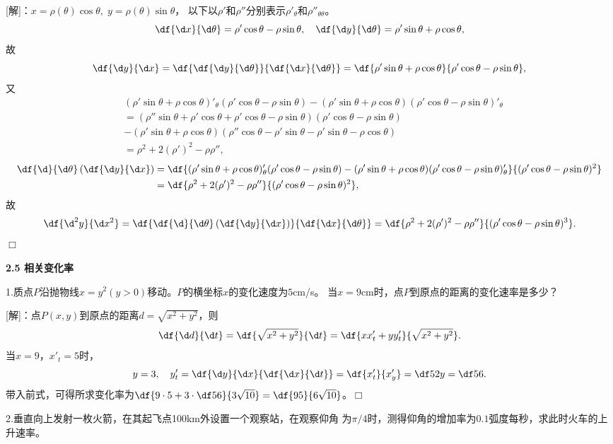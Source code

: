 [解]：$x=\rho(\theta)\cos\theta,\;y=\rho(\theta)\sin\theta$，
以下以$\rho'$和$\rho''$分别表示$\rho'_{\theta}$和$\rho''_{\theta\theta}$。
$$\df{\d x}{\d\theta}=\rho'\cos\theta-\rho\sin\theta,
\quad
\df{\d y}{\d\theta}=\rho'\sin\theta+\rho\cos\theta,$$
故
$$\df{\d y}{\d x}=\df{\df{\d y}{\d\theta}}{\df{\d x}{\d\theta}}
=\df{\rho'\sin\theta+\rho\cos\theta}{\rho'\cos\theta-\rho\sin\theta},$$
又
\begin{align*}
	&(\rho'\sin\theta+\rho\cos\theta)'_{\theta}(\rho'\cos\theta-\rho\sin\theta)
	-(\rho'\sin\theta+\rho\cos\theta)(\rho'\cos\theta-\rho\sin\theta)'_{\theta}\\
	&=(\rho''\sin\theta+\rho'\cos\theta+\rho'\cos\theta-\rho\sin\theta)
	(\rho'\cos\theta-\rho\sin\theta)\\
	&-(\rho'\sin\theta+\rho\cos\theta)
	(\rho''\cos\theta-\rho'\sin\theta-\rho'\sin\theta-\rho\cos\theta)\\
	&=\rho^2+2(\rho')^2-\rho\rho'',
\end{align*}
\begin{align*}
	\df{\d}{\d\theta}\left(\df{\d y}{\d x}\right)
	&=\df{(\rho'\sin\theta+\rho\cos\theta)'_{\theta}(\rho'\cos\theta-\rho\sin\theta)
	-(\rho'\sin\theta+\rho\cos\theta)(\rho'\cos\theta-\rho\sin\theta)'_{\theta}}
	{(\rho'\cos\theta-\rho\sin\theta)^2}\\
	&=\df{\rho^2+2(\rho')^2-\rho\rho''}{(\rho'\cos\theta-\rho\sin\theta)^2},
\end{align*}
故
$$
\df{\d^2y}{\d x^2}
=\df{\df{\d}{\d\theta}\left(\df{\d y}{\d x}\right)}{\df{\d x}{\d\theta}}
=\df{\rho^2+2(\rho')^2-\rho\rho''}{(\rho'\cos\theta-\rho\sin\theta)^3}.
$$
\hfill$\Box$

\begin{center}
	\bf 2.5 相关变化率
\end{center}

\bigskip

1.质点$P$沿抛物线$x=y^2(y>0)$移动。$P$的横坐标$x$的变化速度为$5$cm/s。
当$x=9$cm时，点$P$到原点的距离的变化速率是多少？

[解]：点$P(x,y)$到原点的距离$d=\sqrt{x^2+y^2}$，则
$$\df{\d d}{\d t}=\df{\sqrt{x^2+y^2}}{\d t}
=\df{xx'_t+yy'_t}{\sqrt{x^2+y^2}}.$$
当$x=9$，$x'_t=5$时，
$$
	y=3,\quad
	y'_t=\df{\d y}{\d x}{\df{\d x}{\d t}}
	=\df{x'_t}{x'_y}=\df5{2y}=\df56.
$$
带入前式，可得所求变化率为$\df{9\cdot 5+3\cdot\df56}{3\sqrt{10}}
=\df{95}{6\sqrt{10}}$。\hfill$\Box$

\bigskip

2.垂直向上发射一枚火箭，在其起飞点100km外设置一个观察站，在观察仰角
为$\pi/4$时，测得仰角的增加率为$0.1$弧度每秒，求此时火车的上升速率。

